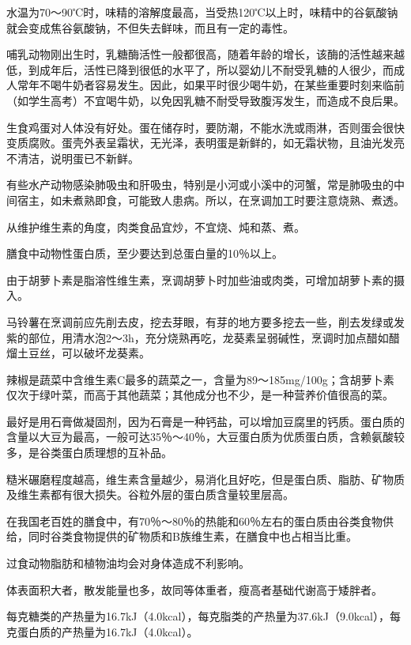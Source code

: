 水温为70～90℃时，味精的溶解度最高，当受热120℃以上时，味精中的谷氨酸钠就会变成焦谷氨酸钠，不但失去鲜味，而且有一定的毒性。

哺乳动物刚出生时，乳糖酶活性一般都很高，随着年龄的增长，该酶的活性越来越低，到成年后，活性已降到很低的水平了，所以婴幼儿不耐受乳糖的人很少，而成人常年不喝牛奶者容易发生。因此，如果平时很少喝牛奶，在某些重要时刻来临前（如学生高考）不宜喝牛奶，以免因乳糖不耐受导致腹泻发生，而造成不良后果。

生食鸡蛋对人体没有好处。蛋在储存时，要防潮，不能水洗或雨淋，否则蛋会很快变质腐败。蛋壳外表呈霜状，无光泽，表明蛋是新鲜的，如无霜状物，且油光发亮不清洁，说明蛋已不新鲜。

有些水产动物感染肺吸虫和肝吸虫，特别是小河或小溪中的河蟹，常是肺吸虫的中间宿主，如未煮熟即食，可能致人患病。所以，在烹调加工时要注意烧熟、煮透。

从维护维生素的角度，肉类食品宜炒，不宜烧、炖和蒸、煮。

膳食中动物性蛋白质，至少要达到总蛋白量的10％以上。

由于胡萝卜素是脂溶性维生素，烹调胡萝卜时加些油或肉类，可增加胡萝卜素的摄入。

马铃薯在烹调前应先削去皮，挖去芽眼，有芽的地方要多挖去一些，削去发绿或发紫的部位，用清水泡2～3h，充分烧熟再吃，龙葵素呈弱碱性，烹调时加点醋如醋熘土豆丝，可以破坏龙葵素。

辣椒是蔬菜中含维生素C最多的蔬菜之一，含量为89～185mg/100g；含胡萝卜素仅次于绿叶菜，而高于其他蔬菜；其他成分也不少，是一种营养价值很高的菜。

最好是用石膏做凝固剂，因为石膏是一种钙盐，可以增加豆腐里的钙质。蛋白质的含量以大豆为最高，一般可达35％～40％，大豆蛋白质为优质蛋白质，含赖氨酸较多，是谷类蛋白质理想的互补品。

糙米碾磨程度越高，维生素含量越少，易消化且好吃，但是蛋白质、脂肪、矿物质及维生素都有很大损失。谷粒外层的蛋白质含量较里层高。

在我国老百姓的膳食中，有70％～80％的热能和60％左右的蛋白质由谷类食物供给，同时谷类食物提供的矿物质和B族维生素，在膳食中也占相当比重。

过食动物脂肪和植物油均会对身体造成不利影响。

体表面积大者，散发能量也多，故同等体重者，瘦高者基础代谢高于矮胖者。

每克糖类的产热量为16.7kJ（4.0kcal），每克脂类的产热量为37.6kJ（9.0kcal），每克蛋白质的产热量为16.7kJ（4.0kcal）。